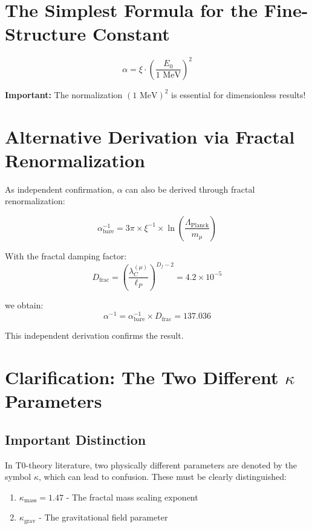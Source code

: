 \documentclass[12pt,a4paper]{article}
\begin{document}
\section*{The Simplest Formula for the Fine-Structure Constant}

\[
\boxed{\alpha = \xi \cdot \left(\frac{E_0}{1 \text{ MeV}}\right)^2}
\]
\begin{tcolorbox}[colback=red!5!white,colframe=red!75!black]
	\textbf{Important:} The normalization $(1 \text{ MeV})^2$ is essential for dimensionless results!
\end{tcolorbox}	
	\section{Alternative Derivation via Fractal Renormalization}
	
	As independent confirmation, $\alpha$ can also be derived through fractal renormalization:
	
	\begin{equation}
		\alpha_{\text{bare}}^{-1} = 3\pi \times \xi^{-1} \times \ln\left(\frac{\Lambda_{\text{Planck}}}{m_\mu}\right)
	\end{equation}
	
	With the fractal damping factor:
	\begin{equation}
		D_{\text{frac}} = \left(\frac{\lambda_C^{(\mu)}}{\ell_P}\right)^{D_f-2} = 4.2 \times 10^{-5}
	\end{equation}
	
	we obtain:
	\begin{equation}
		\alpha^{-1} = \alpha_{\text{bare}}^{-1} \times D_{\text{frac}} = 137.036
	\end{equation}
	
	This independent derivation confirms the result.
	
	\section{Clarification: The Two Different $\kappa$ Parameters}
	
	\subsection{Important Distinction}
	
	In T0-theory literature, two physically different parameters are denoted by the symbol $\kappa$, which can lead to confusion. These must be clearly distinguished:
	
	\begin{enumerate}
		\item $\kappa_{\text{mass}} = 1.47$ - The fractal mass scaling exponent
		\item $\kappa_{\text{grav}}$ - The gravitational field parameter
	\end{enumerate}
	
\end{document}
